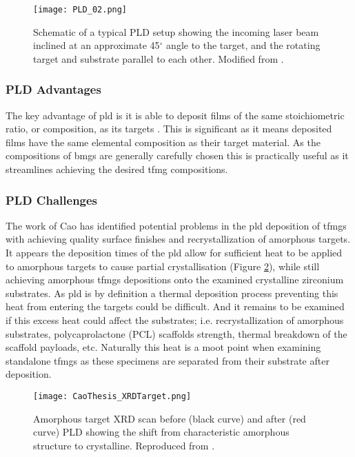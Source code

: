 \documentclass[a4paper,12pt,oneside]{report}%
\begin{document}
\begin{figure}[htbp]
	\centering
	\texttt{[image: PLD\_02.png]}
	\caption[Schematic of a typical PLD setup showing the incoming laser beam inclined at an approximate 45$^{\circ}$ angle to the target, and the rotating target and substrate parallel to each other.]{Schematic of a typical PLD setup showing the incoming laser beam inclined at an approximate 45$^{\circ}$ angle to the target, and the rotating target and substrate parallel to each other. Modified from \cite{Krebs1993}.}
	\label{fig:PLD}
\end{figure}

\subsubsection{PLD Advantages}
The key advantage of \gls{pld} is it is able to deposit films of the same stoichiometric ratio, or composition, as its targets \cite{Dijkkamp1987, Heitz1990}. This is significant as it means deposited films have the same elemental composition as their target material. As the compositions of \glspl{bmg} are generally carefully chosen this is practically useful as it streamlines achieving the desired \gls{tfmg} compositions. 

\subsubsection{PLD Challenges}
The work of Cao \cite{Cao2013} has identified potential problems in the \gls{pld} deposition of \glspl{tfmg} with achieving quality surface finishes and recrystallization of amorphous targets. It appears the deposition times of the \gls{pld} allow for sufficient heat to be applied to amorphous targets to cause partial crystallisation (Figure \ref{fig:ReCryTarget}), while still achieving amorphous \glspl{tfmg} depositions onto the examined crystalline zirconium substrates. As \gls{pld} is by definition a thermal deposition process preventing this heat from entering the targets could be difficult. And it remains to be examined if this excess heat could affect the substrates; i.e. recrystallization of amorphous substrates, polycaprolactone (PCL) scaffolds strength, thermal breakdown of the scaffold payloads, etc. Naturally this heat is a moot point when examining standalone \glspl{tfmg} as these specimens are separated from their substrate after deposition. 

\begin{figure}[htbp]
	\centering
	\texttt{[image: CaoThesis\_XRDTarget.png]}
	\caption[Amorphous target XRD scan before (black curve) and after (red curve) PLD showing the shift from characteristic amorphous structure to crystalline.]{Amorphous target XRD scan before (black curve) and after (red curve) PLD showing the shift from characteristic amorphous structure to crystalline. Reproduced from \cite{Cao2013}.}
	\label{fig:ReCryTarget}
\end{figure}
\end{document}
